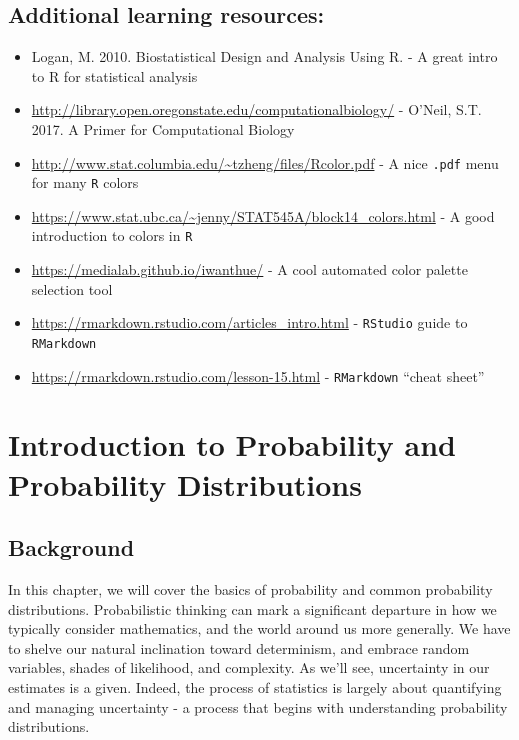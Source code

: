 \documentclass[
]{book}
\begin{document}
\hypertarget{additional-learning-resources-3}{%
\section{Additional learning resources:}\label{additional-learning-resources-3}}

\begin{itemize}
\item
  Logan, M. 2010. Biostatistical Design and Analysis Using R. - A great intro to R for statistical analysis
\item
  \url{http://library.open.oregonstate.edu/computationalbiology/} - O'Neil, S.T. 2017. A Primer for Computational Biology
\item
  \url{http://www.stat.columbia.edu/~tzheng/files/Rcolor.pdf} - A nice \texttt{.pdf} menu for many \texttt{R} colors
\item
  \url{https://www.stat.ubc.ca/~jenny/STAT545A/block14_colors.html} - A good introduction to colors in \texttt{R}
\item
  \url{https://medialab.github.io/iwanthue/} - A cool automated color palette selection tool
\item
  \url{https://rmarkdown.rstudio.com/articles_intro.html} - \texttt{RStudio} guide to \texttt{RMarkdown}
\item
  \url{https://rmarkdown.rstudio.com/lesson-15.html} - \texttt{RMarkdown} ``cheat sheet''
\end{itemize}

\hypertarget{introduction-to-probability-and-probability-distributions}{%
\chapter{Introduction to Probability and Probability Distributions}\label{introduction-to-probability-and-probability-distributions}}

\hypertarget{background-2}{%
\section{Background}\label{background-2}}

In this chapter, we will cover the basics of probability and common probability distributions. Probabilistic thinking can mark a significant departure in how we typically consider mathematics, and the world around us more generally. We have to shelve our natural inclination toward determinism, and embrace random variables, shades of likelihood, and complexity. As we'll see, uncertainty in our estimates is a given. Indeed, the process of statistics is largely about quantifying and managing uncertainty - a process that begins with understanding probability distributions.
\end{document}
